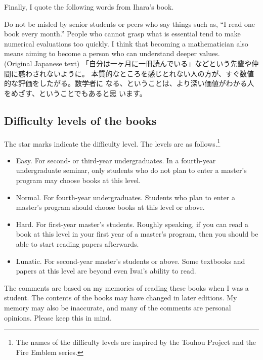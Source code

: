 Finally, I quote the following words from Ihara's book.
\begin{tcolorbox}[mybox]
Do not be misled by senior students or peers who say things such as, ``I read one book every month.'' People who cannot grasp what is essential tend to make numerical evaluations too quickly. I think that becoming a mathematician also means aiming to become a person who can understand deeper values.\\
(Original Japanese text) 「自分は一ヶ月に一冊読んでいる」などという先輩や仲間に惑わされないように。
本質的なところを感じとれない人の方が、すぐ数値的な評価をしたがる。数学者に
なる、ということは、より深い価値がわかる人をめざす、ということでもあると思
います。
\end{tcolorbox}

\subsection{Difficulty levels of the books}
The star marks indicate the difficulty level. The levels are as follows.\footnote{The names of the difficulty levels are inspired by the Touhou Project and the Fire Emblem series.} 
\vspace{-8pt}
\begin{itemize}
  \setlength{\parskip}{0cm} %
  \setlength{\itemsep}{4pt} %
\item[★] Easy. For second- or third-year undergraduates. In a fourth-year undergraduate seminar, only students who do not plan to enter a master's program may choose books at this level.
\item[★★] Normal. For fourth-year undergraduates. Students who plan to enter a master's program should choose books at this level or above.
\item[★★★] Hard. For first-year master's students. Roughly speaking, if you can read a book at this level in your first year of a master's program, then you should be able to start reading papers afterwards.
\item[★★★★] Lunatic. For second-year master's students or above. Some textbooks and papers at this level are beyond even Iwai's ability to read.
\end{itemize}

The comments are based on my memories of reading these books when I was a student. The contents of the books may have changed in later editions. My memory may also be inaccurate, and many of the comments are personal opinions. Please keep this in mind.


